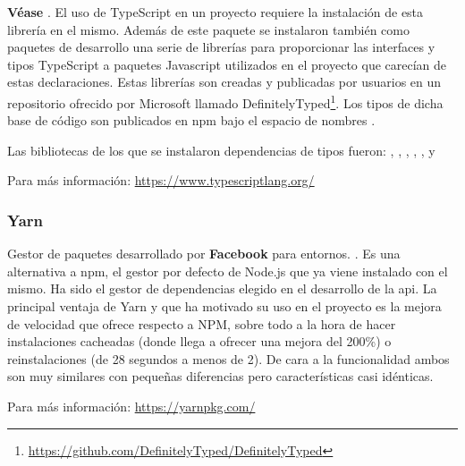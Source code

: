 \textbf{Véase }. El uso de TypeScript en un proyecto requiere la instalación de esta librería en el mismo. Además de este paquete se instalaron también como paquetes de desarrollo una serie de librerías para proporcionar las interfaces y tipos TypeScript a paquetes Javascript utilizados en el proyecto que carecían de estas declaraciones. Estas librerías son creadas y publicadas por usuarios en un repositorio ofrecido por Microsoft llamado DefinitelyTyped\footnote{\href{https://github.com/DefinitelyTyped/DefinitelyTyped}{https://github.com/DefinitelyTyped/DefinitelyTyped}}. Los tipos de dicha base de código son publicados en \acrshort{npm} bajo el espacio de nombres .

Las bibliotecas de los que se instalaron dependencias de tipos fueron: , , , , ,  y 

Para más información: \href{https://www.typescriptlang.org/}{https://www.typescriptlang.org/}

\subsubsection{Yarn}
\label{lib:api:yarn}

Gestor de paquetes desarrollado por \textbf{Facebook} para entornos. . Es una alternativa a \acrshort{npm}, el gestor por defecto de Node.js que ya viene instalado con el mismo. Ha sido el gestor de dependencias elegido en el desarrollo de la \acrshort{api}. La principal ventaja de Yarn y que ha motivado su uso en el proyecto es la mejora de velocidad que ofrece respecto a NPM\cite{yarnNpm}, sobre todo a la hora de hacer instalaciones cacheadas (donde llega a ofrecer una mejora del 200\%) o reinstalaciones (de 28 segundos a menos de 2). De cara a la funcionalidad ambos son muy similares con pequeñas diferencias pero características casi idénticas.

Para más información: \href{https://yarnpkg.com/}{https://yarnpkg.com/}